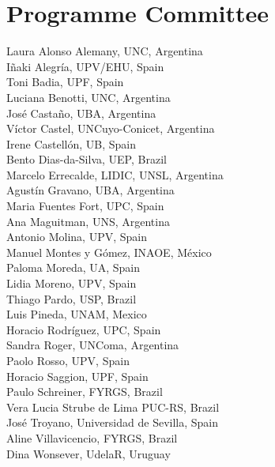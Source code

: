 \documentclass{llncs}
\begin{document}
\vspace{1cm}

\chapter*{Programme Committee}

Laura Alonso Alemany, UNC, Argentina \\
I\~naki Alegr\'ia, UPV/EHU, Spain\\
Toni Badia, UPF, Spain\\
Luciana Benotti, UNC, Argentina \\
Jos\'e Casta\~no, UBA, Argentina\\
V\'ictor Castel, UNCuyo-Conicet, Argentina\\
Irene Castell\'on, UB, Spain\\
Bento Dias-da-Silva, UEP, Brazil\\
Marcelo Errecalde, LIDIC, UNSL, Argentina \\
Agust\'in Gravano, UBA, Argentina\\
Maria Fuentes Fort, UPC, Spain\\
Ana Maguitman, UNS, Argentina\\
Antonio Molina, UPV, Spain\\
Manuel Montes y G\'omez, INAOE, M\'exico\\
Paloma Moreda, UA, Spain\\
Lidia Moreno, UPV, Spain\\
Thiago Pardo, USP, Brazil\\
Luis Pineda, UNAM, Mexico\\
Horacio Rodr\'iguez, UPC, Spain\\
Sandra Roger, UNComa, Argentina\\
Paolo Rosso, UPV, Spain \\
Horacio Saggion, UPF, Spain\\
Paulo Schreiner, FYRGS, Brazil\\
Vera Lucia Strube de Lima PUC-RS, Brazil\\
Jos\'e Troyano, Universidad de Sevilla, Spain\\
Aline Villavicencio, FYRGS, Brazil\\
Dina Wonsever, UdelaR, Uruguay\\


\tableofcontents
%
\mainmatter              %


\tocnuevaentrada

\end{document}
